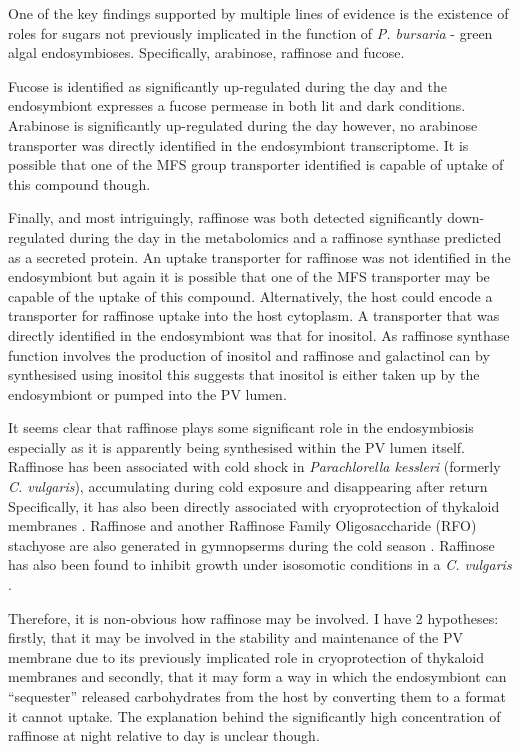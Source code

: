 One of the key findings supported by multiple lines of evidence
is the existence of roles for sugars not previously implicated in the
function of \textit{P. bursaria} - green algal endosymbioses. 
Specifically, arabinose, raffinose and fucose. 

Fucose is identified as significantly up-regulated during the day 
and the endosymbiont expresses a fucose permease in both lit and dark conditions.
Arabinose is significantly up-regulated during the day 
however, no arabinose transporter was directly identified in the endosymbiont 
transcriptome.  It is possible that one of the MFS group transporter identified is 
capable of uptake of this compound though. 

Finally, and most intriguingly, raffinose was both detected
significantly down-regulated during the day in the metabolomics 
and a raffinose synthase predicted as a secreted protein.
An uptake transporter for raffinose was not identified in the endosymbiont 
but again it is possible that one of the MFS transporter may be capable
of the uptake of this compound.  Alternatively, the host could encode
a transporter for raffinose uptake into the host cytoplasm.
A transporter that was directly identified in the endosymbiont was that for inositol.
As raffinose synthase function involves the production of inositol and raffinose
and galactinol can by synthesised using inositol this suggests that inositol
is either taken up by the endosymbiont or pumped into the PV lumen.

It seems clear that raffinose plays some significant role in the endosymbiosis
especially as it is apparently being synthesised within the PV lumen itself.
Raffinose has been associated with cold shock in
\textit{Parachlorella kessleri} (formerly \textit{C. vulgaris}),
accumulating during cold exposure and disappearing after return
Specifically, it has also been directly associated
with cryoprotection of thykaloid membranes \citep{Lineberger1980}.
Raffinose and another Raffinose Family Oligosaccharide (RFO) 
stachyose are also generated in gymnopserms during
the cold season \citep{Kandler1982}.
Raffinose has also been found to inhibit growth under
isosomotic conditions in a \textit{C. vulgaris} 
\citep{Setter1979}.

Therefore, it is non-obvious how raffinose may be involved. I have
2 hypotheses: firstly, that it may be involved in the stability
and maintenance of the PV membrane due to its previously implicated
role in cryoprotection of thykaloid membranes and secondly, that it may form a way
in which the endosymbiont can ``sequester'' released carbohydrates 
from the host by converting them to a format it cannot uptake.  
The explanation behind the significantly high concentration
of raffinose at night relative to day is unclear though. 
%
%

